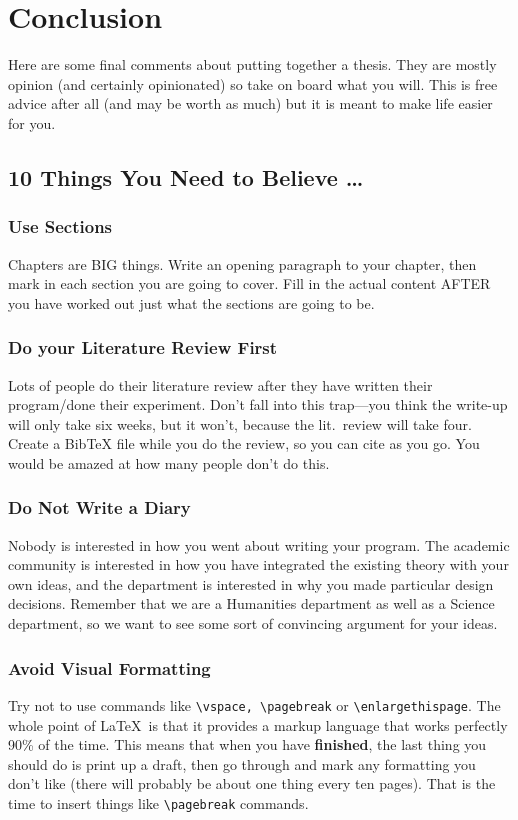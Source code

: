 \chapter{Conclusion}
\label{chap:final}

Here are some final comments about putting together a thesis.  They
are mostly opinion (and certainly opinionated) so take on board what
you will.  This is free advice after all (and may be worth as much)
but it is meant to make life easier for you.

\section{10 Things You Need to Believe \ldots}
\subsection{Use Sections}
Chapters are BIG things.  Write an opening paragraph to your chapter,
then mark in each section you are going to cover.  Fill in the actual
content AFTER you have worked out just what the sections are going to
be.

\subsection{Do your Literature Review First}
Lots of people do their literature review after they have written
their program/done their experiment.  Don't fall into this trap---you
think the write-up will only take six weeks, but it won't, because
the lit.\ review will take four.  Create a BibTeX file while you do
the review, so you can cite as you go.  You would be amazed at how
many people don't do this.

\subsection{Do Not Write a Diary}
Nobody is interested in how you went about writing your program.  The
academic community is interested in how you have integrated the
existing theory with your own ideas, and the department is interested
in why you made particular design decisions.  Remember that we are a
Humanities department as well as a Science department, so we want to
see some sort of convincing argument for your ideas.

\subsection{Avoid Visual Formatting}
Try not to use commands like \verb|\vspace, \pagebreak| or
\verb|\enlargethispage|.  The whole point of \LaTeX\ is that it
provides a markup language that works perfectly 90\% of the time.
This means that when you have {\bf finished}, the last thing you
should do is print up a draft, then go through and mark any formatting
you don't like (there will probably be about one thing every ten
pages).  That is the time to insert things like \verb|\pagebreak|
commands.

